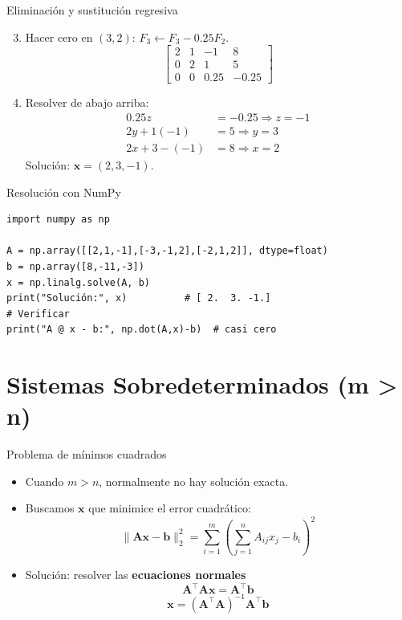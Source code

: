 \documentclass[aspectratio=169, 10pt, xcolor=table]{beamer}
\begin{document}
\begin{frame}{Eliminación y sustitución regresiva}
    \begin{enumerate}
        \setcounter{enumi}{2}
        \item Hacer cero en $(3,2)$: $F_3 \leftarrow F_3 - 0.25F_2$.
        \[
        \left[\begin{array}{ccc|c}
            2 & 1 & -1 & 8 \\
            0 & 2 & 1 & 5 \\
            0 & 0 & 0.25 & -0.25
        \end{array}\right]
        \]
        \item Resolver de abajo arriba:
        \begin{align*}
            0.25z &= -0.25 \Rightarrow z = -1 \\
            2y + 1(-1) &= 5 \Rightarrow y = 3 \\
            2x + 3 - (-1) &= 8 \Rightarrow x = 2
        \end{align*}
        Solución: $\mathbf{x} = (2,3,-1)$.
    \end{enumerate}
\end{frame}

\begin{frame}[fragile]{Resolución con NumPy}
    \begin{lstlisting}
import numpy as np

A = np.array([[2,1,-1],[-3,-1,2],[-2,1,2]], dtype=float)
b = np.array([8,-11,-3])
x = np.linalg.solve(A, b)
print("Solución:", x)          # [ 2.  3. -1.]
# Verificar
print("A @ x - b:", np.dot(A,x)-b)  # casi cero
    \end{lstlisting}
\end{frame}

\section{Sistemas Sobredeterminados (m > n)}

\begin{frame}{Problema de mínimos cuadrados}
    \begin{itemize}
        \item Cuando $m > n$, normalmente no hay solución exacta.
        \item Buscamos $\mathbf{x}$ que minimice el error cuadrático:
        \[
        \|\mathbf{A}\mathbf{x} - \mathbf{b}\|_2^2 = \sum_{i=1}^m \left( \sum_{j=1}^n A_{ij}x_j - b_i \right)^2
        \]
        \item Solución: resolver las \textbf{ecuaciones normales}
        \[
        \mathbf{A}^\top \mathbf{A} \mathbf{x} = \mathbf{A}^\top \mathbf{b}
        \]
        \[
        \mathbf{x} = (\mathbf{A}^\top \mathbf{A})^{-1}\mathbf{A}^\top \mathbf{b}
        \]
    \end{itemize}
\end{frame}
\end{document}
